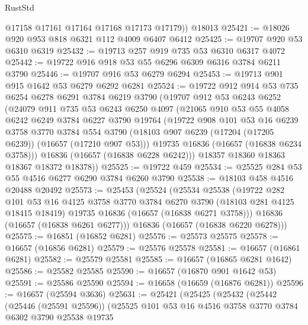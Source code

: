 \begin{lexlean}{RustStd}
\begin{coremodule}
        @17158
        @17161
        @17164
        @17168
        @17173
        @17179))
    @18013
@25421 := @18026 @920 @953 @818 @6321 @112 @4009 @6407 @6412
@25425 := @19707 @920 @53 @6310 @6319
@25432 := @19713 @257 @919 @735 @53 @6310 @6317 @4072
@25442 := @19722 @916 @918 @53 @55 @6296 @6309 @6316 @3784 @6211 @3790
@25446 := @19707 @916 @53 @6279 @6294
@25453 := @19713 @901 @915 @1642 @53 @6279 @6292 @6281
@25524 := @19722
    @912
    @914
    @53
    @735
    @6254
    @6278
    @6291
    @3784
    @6219
    @3790
    (@19707
      @912
      @53
      @6243
      @6252
      (@24079
        @911
        @735
        @53
        @6243
        @6250
        @4097
        (@21065
          @910
          @53
          @55
          @4058
          @6242
          @6249
          @3784
          @6227
          @3790
          @19764
          (@19722
            @908
            @101
            @53
            @16
            @6239
            @3758
            @3770
            @3784
            @554
            @3790
            (@18103 @907 @6239 (@17204 (@17205 @6239)) (@16657 (@17210 @907 @53)))
            @19735
            @16836
            (@16657 (@16838 @6234 @3758)))
          @16836
          (@16657 (@16838 @6228 @6242)))
        @18357
        @18360
        @18363
        @18367
        @18372
        @18378))
@25525 := @19722 @459
@25534 := @25525 @284 @53 @55 @4516 @6277 @6290 @3784 @6260 @3790
@25538 := @18103 @458 @4516 @20488 @20492
@25573 := @25453
    (@25524
      (@25534
        @25538
        (@19722
          @282
          @101
          @53
          @16
          @4125
          @3758
          @3770
          @3784
          @6270
          @3790
          (@18103 @281 @4125 @18415 @18419)
          @19735
          @16836
          (@16657 (@16838 @6271 @3758)))
        @16836
        (@16657 (@16838 @6261 @6277)))
      @16836
      (@16657 (@16838 @6220 @6278)))
@25575 := @16851 (@16852 @6281)
@25576 := @25573 @25575
@25578 := @16657 (@16856 @6281)
@25579 := @25576 @25578
@25581 := @16657 (@16861 @6281)
@25582 := @25579 @25581
@25585 := @16657 (@16865 @6281 @1642)
@25586 := @25582 @25585
@25590 := @16657 (@16870 @901 @1642 @53)
@25591 := @25586 @25590
@25594 := @16658 (@16659 (@16876 @6281))
@25596 := @16657 (@25594 @3636)
@25631 := @25421
    (@25425
      (@25432
        (@25442
          (@25446 (@25591 @25596))
          (@25525
            @101
            @53
            @16
            @4516
            @3758
            @3770
            @3784
            @6302
            @3790
            @25538
            @19735

\end{coremodule}
\end{lexlean}
